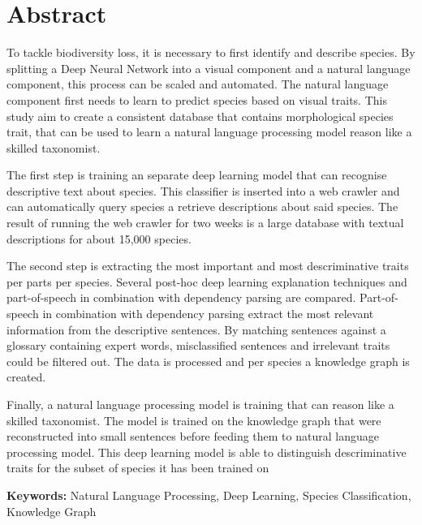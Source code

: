 \documentclass[a4paper, 12pt, oneside]{book} %
\begin{document}
\newpage
\thispagestyle{empty}
\section*{Abstract}
To tackle biodiversity loss, it is necessary to first identify and describe species.
By splitting a Deep Neural Network into a visual component and a natural language component, this process can be scaled and automated.
The natural language component first needs to learn to predict species based on visual traits.
This study aim to create a consistent database that contains morphological species trait, that can be used to learn a natural language processing model reason like a skilled taxonomist.

The first step is training an separate deep learning model that can recognise descriptive text about species.
This classifier is inserted into a web crawler and can automatically query species a retrieve descriptions about said species.
The result of running the web crawler for two weeks is a large database with textual descriptions for about 15,000 species.

The second step is extracting the most important and most descriminative traits per parts per species.
Several post-hoc deep learning explanation techniques and part-of-speech in combination with dependency parsing are compared.
Part-of-speech in combination with dependency parsing extract the most relevant information from the descriptive sentences.
By matching sentences against a glossary containing expert words, misclassified sentences and irrelevant traits could be filtered out.
The data is processed and per species a knowledge graph is created.

Finally, a natural language processing model is training that can reason like a skilled taxonomist.
The model is trained on the knowledge graph that were reconstructed into small sentences before feeding them to natural language processing model.
This deep learning model is able to distinguish descriminative traits for the subset of species it has been trained on

\vspace{5mm} %
\noindent
{\bf Keywords:} Natural Language Processing, Deep Learning, Species Classification, Knowledge Graph 


\glsaddall\printglossary[type=\acronymtype, nonumberlist]
\thispagestyle{empty}
\printglossary[nonumberlist]


\thispagestyle{empty}
\tableofcontents
\thispagestyle{empty}
\listoffigures
\thispagestyle{empty}
\listoftables
\thispagestyle{empty}
\newpage
\end{document}

